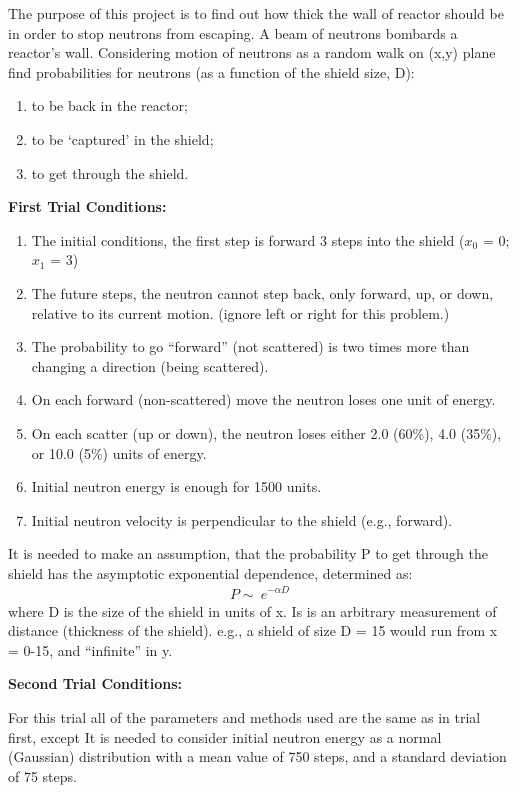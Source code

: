 \documentclass[12pt]{article}
\begin{document}
The purpose of this project is to find out how thick the wall of reactor should be in order to stop neutrons from escaping.
A beam of neutrons bombards a reactor’s wall. 
Considering motion of neutrons as a random walk on (x,y) plane find probabilities for neutrons (as a function of the shield size, D):
\begin{enumerate}
    \item to be back in the reactor;
    \item to be ‘captured’ in the shield;
    \item to get through the shield.\
\end{enumerate}
\begin{center}
\textbf{First Trial Conditions:}
\end{center}
\begin{enumerate}
    \item The initial conditions, the first step is forward 3 steps into the shield ($x_0$ = 0; $x_1$ = 3)
    \item The future steps, the neutron cannot step back, only forward, up, or
down, relative to its current motion. (ignore left or right for this
problem.)
    \item The probability to go “forward” (not scattered) is two times more than
changing a direction (being scattered).
    \item On each forward (non-scattered) move the neutron loses one unit of
energy.
    \item On each scatter (up or down), the neutron loses either 2.0 (60\%),
4.0 (35\%), or 10.0 (5\%) units of energy.
    \item Initial neutron energy is enough for 1500 units.
    \item Initial neutron velocity is perpendicular to the shield (e.g., forward).
\end{enumerate}
It is needed to make an assumption, that the probability P to get through the shield has the asymptotic exponential dependence, determined as: \begin{align}
    P \sim~ e^{-\alpha D}
\end{align} where D is the size of the shield in
units of x. Is is an arbitrary measurement of distance (thickness of the shield). e.g., a shield of size D = 15 would run from x = 0-15, and
“infinite” in y.
\begin{center}
\textbf{Second Trial Conditions:}
\end{center}
 For this trial all of the parameters and methods used are the same as in trial first, except It is needed to consider initial neutron energy as a normal (Gaussian) distribution with a mean value of 750 steps, and a standard deviation of 75 steps.
\end{document}
